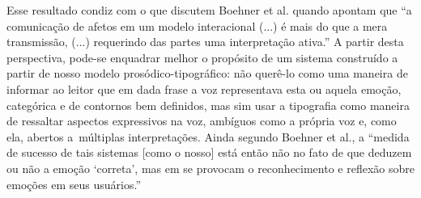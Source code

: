 \documentclass[a4paper]{tufte-handout}
\begin{document}
Esse resultado condiz com o que discutem Boehner et al. quando apontam que ``a comunicação de afetos em um modelo interacional (...) é mais do que a mera transmissão, (...) requerindo das partes uma interpretação ativa.''  A partir desta perspectiva, pode-se enquadrar melhor o propósito de um sistema construído a partir de nosso modelo prosódico-tipográfico: não querê-lo como uma maneira de informar ao leitor que em dada frase a voz representava esta ou aquela emoção, categórica e de contornos bem definidos, mas sim usar a tipografia como maneira de ressaltar aspectos expressivos na voz, ambíguos como a própria voz e, como ela, abertos a~múltiplas interpretações. Ainda segundo Boehner et al., a ``medida de sucesso de tais sistemas [como o nosso] está então não no fato de que deduzem ou não a emoção `correta', mas em se provocam o reconhecimento e reflexão sobre emoções em seus usuários.'' 




\renewcommand{\refname}{Bibliografia}
\makeatletter
\renewcommand{\bibsection}{%
   \section{\refname%
            \@mkboth{\MakeUppercase{\refname}}{\MakeUppercase{\refname}}%
   }
}
\makeatother




%
%
\end{document}
